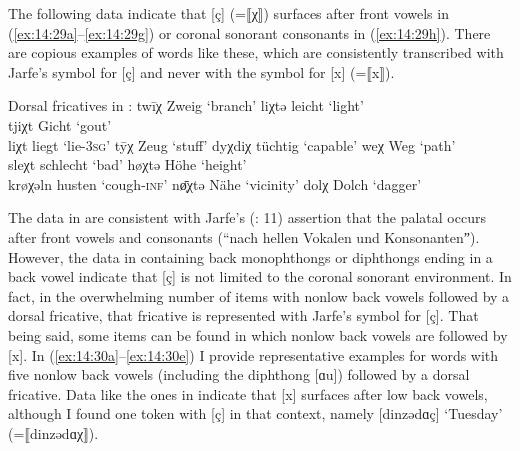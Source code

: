 The following data indicate that [ç] (=⟦χ⟧) surfaces after front vowels in (\ref{ex:14:29a}--\ref{ex:14:29g}) or coronal sonorant consonants in (\ref{ex:14:29h}). There are copious examples of words like these, which are consistently transcribed with Jarfe’s symbol for [ç] and never with the symbol for [x] (=⟦x⟧).

\ea%
\label{ex:14:29}Dorsal fricatives in :
\ea\label{ex:14:29a} twīχ \tab [tviːç] \tab Zweig \tab ‘branch’ 
\ex\label{ex:14:29b} liχtə \tab [liçtə] \tab leicht \tab ‘light’ \\
    tjiχt \tab [tjiçt] \tab Gicht \tab ‘gout’ \\
    liχt \tab [liçt] \tab liegt \tab ‘lie\textsc{{}-3sg}’ 
\ex\label{ex:14:29c} t\={y}χ \tab [tyːç] \tab Zeug \tab ‘stuff’ 
\ex\label{ex:14:29d} dyχdiχ \tab [dyçdiç] \tab tüchtig \tab ‘capable’ 
\ex\label{ex:14:29e} weχ \tab [veç] \tab Weg \tab ‘path’ \\
    sleχt \tab [sleçt] \tab schlecht \tab ‘bad’ 
\ex\label{ex:14:29f} høχtə \tab [høçtə] \tab Höhe \tab ‘height’ \\
    krøχəln \tab [krøçəln] \tab husten \tab ‘cough\textsc{{}-inf}’ 
\ex\label{ex:14:29g} n\={ø̜}χtə \tab [nøːçtə] \tab Nähe \tab ‘vicinity’ 
\ex\label{ex:14:29h} dolχ \tab [dolç] \tab Dolch \tab ‘dagger’ 
\z 
\z 

The data in  are consistent with Jarfe’s (\citeyear{Jarfe1929}: 11) assertion that the palatal occurs after front vowels and consonants (“nach hellen Vokalen und Konsonantenˮ). However, the data in \citet{Jarfe1929} containing back monophthongs or diphthongs ending in a back vowel indicate that [ç] is not limited to the coronal sonorant environment. In fact, in the overwhelming number of items with nonlow back vowels followed by a dorsal fricative, that fricative is represented with Jarfe’s symbol for [ç]. That being said, some items can be found in which nonlow back vowels are followed by [x]. In (\ref{ex:14:30a}--\ref{ex:14:30e}) I provide representative examples for words with five nonlow back vowels (including the diphthong [ɑu]) followed by a dorsal fricative. Data like the ones in  indicate that [x] surfaces after low back vowels, although I found one token with [ç] in that context, namely [dinzədɑç] ‘Tuesday’ (=⟦dinzədɑχ⟧).


